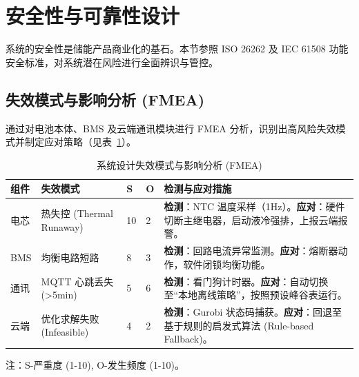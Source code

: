 \section{安全性与可靠性设计}

系统的安全性是储能产品商业化的基石。本节参照 ISO 26262 及 IEC 61508 功能安全标准，对系统潜在风险进行全面辨识与管控。

\subsection{失效模式与影响分析 (FMEA)}

通过对电池本体、BMS 及云端通讯模块进行 FMEA 分析，识别出高风险失效模式并制定应对策略（见表~\ref{tab:fmea}）。

\begin{table}[htbp]
    \centering
    \caption{系统设计失效模式与影响分析 (FMEA)}
    \label{tab:fmea}
    \begin{tabularx}{\textwidth}{|l|X|l|l|X|}
        \hline
        \textbf{组件} & \textbf{失效模式}         & \textbf{S} & \textbf{O} & \textbf{检测与应对措施}                                                                   \\ \hline
        电芯          & 热失控 (Thermal Runaway) & 10         & 2          & \textbf{检测}：NTC 温度采样（1Hz）。\newline \textbf{应对}：硬件切断主继电器，启动液冷强排，上报云端报警。             \\ \hline
        BMS         & 均衡电路短路                & 8          & 3          & \textbf{检测}：回路电流异常监测。\newline \textbf{应对}：熔断器动作，软件闭锁均衡功能。                          \\ \hline
        通讯          & MQTT 心跳丢失 (>5min)     & 5          & 6          & \textbf{检测}：看门狗计时器。\newline \textbf{应对}：自动切换至“本地离线策略”，按照预设峰谷表运行。                   \\ \hline
        云端          & 优化求解失败 (Infeasible)   & 4          & 2          & \textbf{检测}：Gurobi 状态码捕获。\newline \textbf{应对}：回退至基于规则的启发式算法 (Rule-based Fallback)。 \\ \hline
    \end{tabularx}
    \begin{tablenotes}
        \footnotesize
        \item 注：S-严重度 (1-10), O-发生频度 (1-10)。
    \end{tablenotes}
\end{table}

